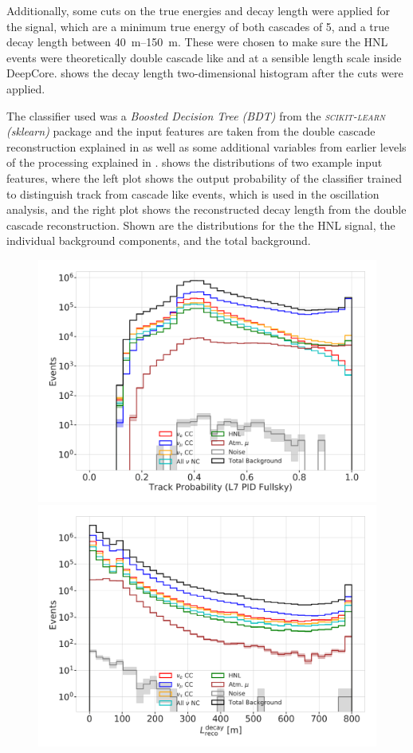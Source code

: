 Additionally, some cuts on the true energies and decay length were applied for the signal, which are a minimum true energy of both cascades of \SI{5}{\gev}, and a true decay length between \SIrange[range-phrase={~and~}]{40}{150}{\meter}. These were chosen to make sure the HNL events were theoretically double cascade like and at a sensible length scale inside DeepCore.  shows the decay length two-dimensional histogram after the cuts were applied.

The classifier used was a \textit{Boosted Decision Tree (BDT)} from the \textit{\textsc{scikit-learn} (sklearn)} package  and the input features are taken from the double cascade reconstruction explained in  as well as some additional variables from earlier levels of the processing explained in .  shows the distributions of two example input features, where the left plot shows the output probability of the classifier trained to distinguish track from cascade like events, which is used in the oscillation analysis, and the right plot shows the reconstructed decay length from the double cascade reconstruction. Shown are the distributions for the the HNL signal, the individual background components, and the total background. 

\begin{figure}[h]
	\centering
    \includegraphics[width=0.49\linewidth]{figures/results/190607/classification/1_d_distr_L7_PIDClassifier_FullSky_ProbTrack_with_ratio_unweighted.png}
    \includegraphics[width=0.49\linewidth]{figures/results/190607/classification/1_d_distr_reco_decayL_with_ratio_unweighted.png}
    \caption[]{}
\end{figure}

